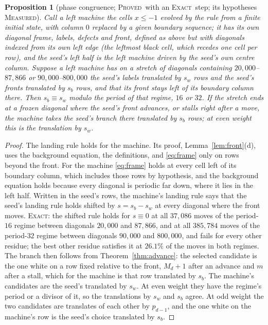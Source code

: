 \documentclass[11pt]{article}
\newtheorem{proposition}[theorem]{Proposition}
\theoremstyle{definition}
\theoremstyle{remark}
\newcommand{\PROVED}{\textsc{Proved}}
\newcommand{\EXACT}{\textsc{Exact}}
\newcommand{\MEASURED}{\textsc{Measured}}
\begin{document}
\begin{proposition}[phase congruence; \PROVED\ with an \EXACT\ step; its hypotheses \MEASURED]\label{prop:phase}
Call a \emph{left machine} the cells $x\le-1$ evolved by the rule from a finite initial state, with column $0$ replaced by a given boundary sequence; it has its own diagonal frame, labels, defects and front, defined as above but with diagonals indexed from its own left edge (the leftmost black cell, which recedes one cell per row), and the seed's left half is the left machine driven by the seed's own centre column. Suppose a left machine has on a stretch of diagonals containing $20{,}000$--$87{,}866$ or $90{,}000$--$800{,}000$ the seed's labels translated by $s_w$ rows and the seed's fronts translated by $s_b$ rows, and that its front stays left of its boundary column there. Then $s_b\equiv s_w$ modulo the period of that regime, $16$ or $32$. If the stretch ends at a frozen diagonal where the seed's front advances, or stalls right after a move, the machine takes the seed's branch there translated by $s_b$ rows; at even weight this is the translation by $s_w$.
\end{proposition}

\begin{proof}
The landing rule holds for the machine. Its proof, Lemma~\ref{lem:front}(d), uses the background equation, the definitions, and \eqref{eq:frame} only on rows beyond the front. For the machine \eqref{eq:frame} holds at every cell left of its boundary column, which includes those rows by hypothesis, and the background equation holds because every diagonal is periodic far down, where it lies in the left half. Written in the seed's rows, the machine's landing rule says that the seed's landing rule holds shifted by $s=s_b-s_w$ at every diagonal where the front moves. \EXACT: the shifted rule holds for $s\equiv0$ at all $37{,}086$ moves of the period-$16$ regime between diagonals $20{,}000$ and $87{,}866$, and at all $385{,}784$ moves of the period-$32$ regime between diagonals $90{,}000$ and $800{,}000$, and fails for every other residue; the best other residue satisfies it at $26.1\%$ of the moves in both regimes. The branch then follows from Theorem~\ref{thm:advance}: the selected candidate is the one white on a row fixed relative to the front, $M_d+1$ after an advance and $m$ after a stall, which for the machine is that row translated by $s_b$. The machine's candidates are the seed's translated by $s_w$. At even weight they have the regime's period or a divisor of it, so the translations by $s_w$ and $s_b$ agree. At odd weight the two candidates are translates of each other by $p_{d-1}$, and the one white on the machine's row is the seed's choice translated by $s_b$.
\end{proof}
\end{document}
